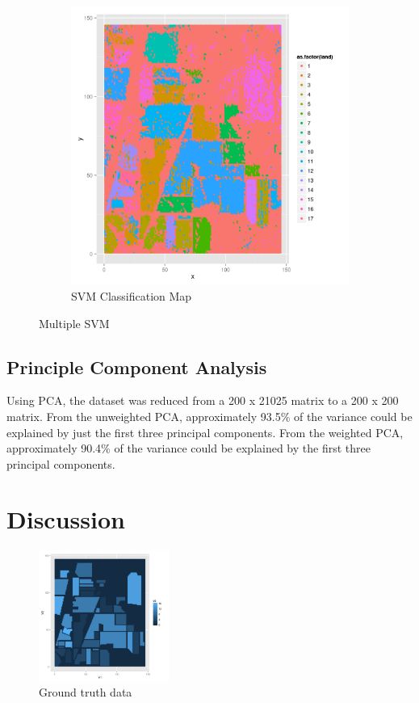 \documentclass[10pt,letterpaper]{article}
\begin{document}
\begin{figure}[!hb]
\begin{center}
\begin{subfigure}[b]{0.3\textwidth}
\includegraphics[width=\textwidth]{SVM_Landtypes.png}
\caption{SVM Classification Map}
\end{subfigure}
\caption{Multiple SVM}
\end{center}
\end{figure}
\subsection{Principle Component Analysis}
Using PCA, the dataset was reduced from a 200 x 21025 matrix to a 200 x 200 matrix. From the unweighted PCA, approximately 93.5\% of the variance could be explained by just the first three principal components. From the weighted PCA, approximately 90.4\% of the variance could be explained by the first three principal components.
\section{Discussion}
\begin{figure}
\begin{center}
\includegraphics[width=0.38\textwidth]{../Presentation/gt.png}
\caption{Ground truth data}
\end{center}
\end{figure}
\end{document}
